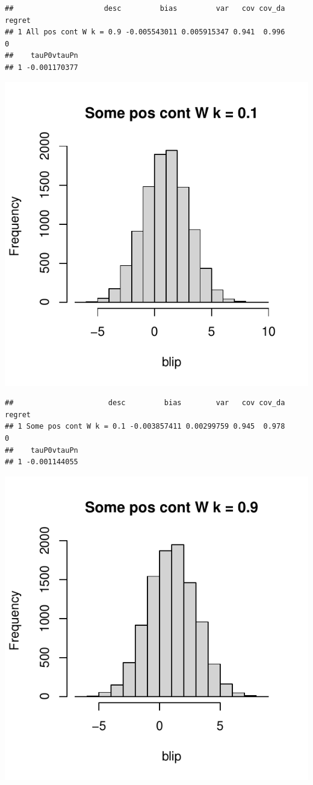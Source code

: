 \documentclass[11pt]{article}\usepackage[]{graphicx}\usepackage[table]{xcolor}
\makeatletter
\def\maxwidth{ %
  \ifdim\Gin@nat@width>\linewidth
    \linewidth
  \else
    \Gin@nat@width
  \fi
}
\newenvironment{kframe}{%
 \def\at@end@of@kframe{}%
 \ifinner\ifhmode%
  \def\at@end@of@kframe{\end{minipage}}%
  \begin{minipage}{\columnwidth}%
 \fi\fi%
 \def\FrameCommand##1{\hskip\@totalleftmargin \hskip-\fboxsep
 \colorbox{shadecolor}{##1}\hskip-\fboxsep
     \hskip-\linewidth \hskip-\@totalleftmargin \hskip\columnwidth}%
 \MakeFramed {\advance\hsize-\width
   \@totalleftmargin\z@ \linewidth\hsize
   \@setminipage}}%
 {\par\unskip\endMakeFramed%
 \at@end@of@kframe}
\newenvironment{knitrout}{}{} %
\makeatother
\begin{document}
\begin{knitrout}
\begin{kframe}\begin{verbatim}
##                     desc         bias         var   cov cov_da regret
## 1 All pos cont W k = 0.9 -0.005543011 0.005915347 0.941  0.996      0
##    tauP0vtauPn
## 1 -0.001170377
\end{verbatim}
\end{kframe}
\includegraphics[width=\maxwidth]{figure/unnamed-chunk-4-8} 
\begin{kframe}\begin{verbatim}
##                      desc         bias        var   cov cov_da regret
## 1 Some pos cont W k = 0.1 -0.003857411 0.00299759 0.945  0.978      0
##    tauP0vtauPn
## 1 -0.001144055
\end{verbatim}
\end{kframe}
\includegraphics[width=\maxwidth]{figure/unnamed-chunk-4-9} 

\end{knitrout}
\end{document}
